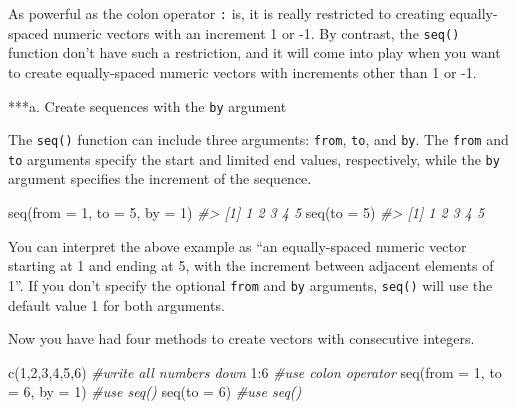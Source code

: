 \documentclass[
]{book}
\newenvironment{Shaded}{\begin{snugshade}}{\end{snugshade}}
\newcommand{\AttributeTok}[1]{\textcolor[rgb]{0.77,0.63,0.00}{#1}}
\newcommand{\CommentTok}[1]{\textcolor[rgb]{0.56,0.35,0.01}{\textit{#1}}}
\newcommand{\DecValTok}[1]{\textcolor[rgb]{0.00,0.00,0.81}{#1}}
\newcommand{\FunctionTok}[1]{\textcolor[rgb]{0.00,0.00,0.00}{#1}}
\newcommand{\NormalTok}[1]{#1}
\newcommand{\SpecialCharTok}[1]{\textcolor[rgb]{0.00,0.00,0.00}{#1}}
\newenvironment{blackbox}{
  \definecolor{shadecolor}{rgb}{0, 0, 0}  %
  \color{white}
  \begin{shaded}}
 {\end{shaded}}
\newenvironment{infobox}[1]
  {
  \begin{itemize}
  \renewcommand{\labelitemi}{
    \raisebox{-.7\height}[0pt][0pt]{
      {\setkeys{Gin}{width=3em,keepaspectratio}
        \texttt{[image: pics/\#1]}}
    }
  }
  \setlength{\fboxsep}{1em}
  \begin{blackbox}
  \item
  }
  {
  \end{blackbox}
  \end{itemize}
  }
\begin{document}
As powerful as the colon operator \texttt{:} is, it is really restricted to creating equally-spaced numeric vectors with an increment 1 or -1. By contrast, the \texttt{seq()} function don't have such a restriction, and it will come into play when you want to create equally-spaced numeric vectors with increments other than 1 or -1.

***a. Create sequences with the \texttt{by} argument

The \texttt{seq()} function can include three arguments: \texttt{from}, \texttt{to}, and \texttt{by}. The \texttt{from} and \texttt{to} arguments specify the start and limited end values, respectively, while the \texttt{by} argument specifies the increment of the sequence.

\begin{Shaded}
\begin{Highlighting}[]
\FunctionTok{seq}\NormalTok{(}\AttributeTok{from =} \DecValTok{1}\NormalTok{, }\AttributeTok{to =} \DecValTok{5}\NormalTok{, }\AttributeTok{by =} \DecValTok{1}\NormalTok{)}
\CommentTok{\#\textgreater{} [1] 1 2 3 4 5}
\FunctionTok{seq}\NormalTok{(}\AttributeTok{to =} \DecValTok{5}\NormalTok{)}
\CommentTok{\#\textgreater{} [1] 1 2 3 4 5}
\end{Highlighting}
\end{Shaded}

You can interpret the above example as ``an equally-spaced numeric vector starting at 1 and ending at 5, with the increment between adjacent elements of 1''. If you don't specify the optional \texttt{from} and \texttt{by} arguments, \texttt{seq()} will use the default value 1 for both arguments.

\begin{infobox}{caution}

Now you have had four methods to create vectors with consecutive integers.

\begin{Shaded}
\begin{Highlighting}[]
\FunctionTok{c}\NormalTok{(}\DecValTok{1}\NormalTok{,}\DecValTok{2}\NormalTok{,}\DecValTok{3}\NormalTok{,}\DecValTok{4}\NormalTok{,}\DecValTok{5}\NormalTok{,}\DecValTok{6}\NormalTok{)                }\CommentTok{\#write all numbers down}
\DecValTok{1}\SpecialCharTok{:}\DecValTok{6}                           \CommentTok{\#use colon operator}
\FunctionTok{seq}\NormalTok{(}\AttributeTok{from =} \DecValTok{1}\NormalTok{, }\AttributeTok{to =} \DecValTok{6}\NormalTok{, }\AttributeTok{by =} \DecValTok{1}\NormalTok{) }\CommentTok{\#use seq()}
\FunctionTok{seq}\NormalTok{(}\AttributeTok{to =} \DecValTok{6}\NormalTok{)                   }\CommentTok{\#use seq()}
\end{Highlighting}
\end{Shaded}

\end{infobox}
\end{document}
